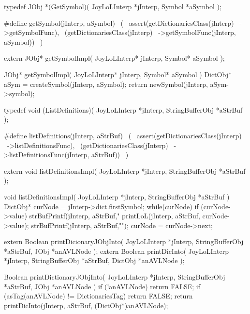 \startCHeader
typedef JObj *(GetSymbol)(
  JoyLoLInterp *jInterp,
  Symbol       *aSymbol
);

#define getSymbol(jInterp, aSymbol)       \
  (                                       \
    assert(getDictionariesClass(jInterp)  \
      ->getSymbolFunc),                   \
    (getDictionariesClass(jInterp)        \
      ->getSymbolFunc(jInterp, aSymbol))  \
  )
\stopCHeader

\setCHeaderStream{private}
\startCHeader
extern JObj* getSymbolImpl(
  JoyLoLInterp* jInterp,
  Symbol* aSymbol
);
\stopCHeader
{}

\startCCode
JObj* getSymbolImpl(
  JoyLoLInterp* jInterp,
  Symbol* aSymbol
) {
  DictObj* aSym = createSymbol(jInterp, aSymbol);
  return newSymbol(jInterp, aSym->symbol);
}
\stopCCode

\startCHeader
typedef void (ListDefinitions)(
  JoyLoLInterp    *jInterp,
  StringBufferObj *aStrBuf
);

#define listDefinitions(jInterp, aStrBuf)       \
  (                                             \
    assert(getDictionariesClass(jInterp)        \
      ->listDefinitionsFunc),                   \
    (getDictionariesClass(jInterp)              \
      ->listDefinitionsFunc(jInterp, aStrBuf))  \
  )
\stopCHeader

\setCHeaderStream{private}
\startCHeader
extern void listDefinitionsImpl(
  JoyLoLInterp    *jInterp,
  StringBufferObj *aStrBuf
);
\stopCHeader
\setCHeaderStream{public}

\startCCode
void listDefinitionsImpl(
  JoyLoLInterp    *jInterp,
  StringBufferObj *aStrBuf
) {
  DictObj* curNode = jInterp->dict.firstSymbol;
  while(curNode) {
    if (curNode->value) {
      strBufPrintf(jInterp, aStrBuf,"%
      printLoL(jInterp, aStrBuf, curNode->value);
      strBufPrintf(jInterp, aStrBuf,"\n");
    }
    curNode = curNode->next;
  }
}
\stopCCode

\setCHeaderStream{private}
\startCHeader
extern Boolean printDicionaryJObjInto(
  JoyLoLInterp    *jInterp,
  StringBufferObj *aStrBuf,
  JObj        *anAVLNode
);
extern Boolean printDicInto(
  JoyLoLInterp    *jInterp,
  StringBufferObj *aStrBuf,
  DictObj         *anAVLNode
);
\stopCHeader
{}

\startCCode
Boolean printDictionaryJObjInto(
  JoyLoLInterp    *jInterp,
  StringBufferObj *aStrBuf,
  JObj        *anAVLNode
) {
  if (!anAVLNode) return FALSE;
  if (asTag(anAVLNode) != DictionariesTag) return FALSE;
  return printDicInto(jInterp, aStrBuf, (DictObj*)anAVLNode);
}

